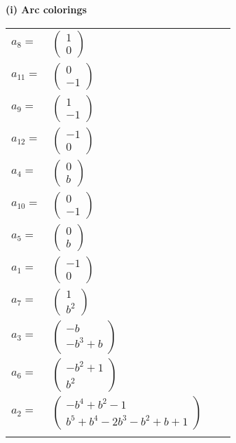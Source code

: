 \documentclass[1p]{elsarticle_modified}
\theoremstyle{definition}
\begin{document}
\flushleft \textbf{(i) Arc colorings}\\
\begin{tabular}{m{7pt} m{180pt} m{7pt} m{180pt} }
\flushright $a_{8}=$&$\begin{pmatrix}1\\0\end{pmatrix}$ \\
\flushright $a_{11}=$&$\begin{pmatrix}0\\-1\end{pmatrix}$ \\
\flushright $a_{9}=$&$\begin{pmatrix}1\\-1\end{pmatrix}$ \\
\flushright $a_{12}=$&$\begin{pmatrix}-1\\0\end{pmatrix}$ \\
\flushright $a_{4}=$&$\begin{pmatrix}0\\b\end{pmatrix}$ \\
\flushright $a_{10}=$&$\begin{pmatrix}0\\-1\end{pmatrix}$ \\
\flushright $a_{5}=$&$\begin{pmatrix}0\\b\end{pmatrix}$ \\
\flushright $a_{1}=$&$\begin{pmatrix}-1\\0\end{pmatrix}$ \\
\flushright $a_{7}=$&$\begin{pmatrix}1\\b^2\end{pmatrix}$ \\
\flushright $a_{3}=$&$\begin{pmatrix}- b\\- b^3+b\end{pmatrix}$ \\
\flushright $a_{6}=$&$\begin{pmatrix}- b^2+1\\b^2\end{pmatrix}$ \\
\flushright $a_{2}=$&$\begin{pmatrix}- b^4+b^2-1\\b^5+b^4-2 b^3- b^2+b+1\end{pmatrix}$\\&\end{tabular}
\end{document}
